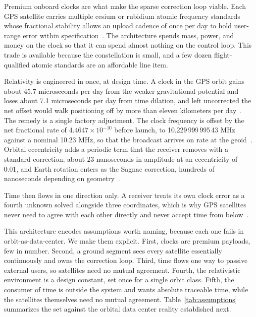 \documentclass[twocolumn,10pt]{article}
\begin{document}
Premium onboard clocks are what make the sparse correction loop viable. Each GPS satellite carries multiple cesium or rubidium atomic frequency standards whose fractional stability allows an upload cadence of once per day to hold user-range error within specification~\cite{gpssps,ashby2003}. The architecture spends mass, power, and money on the clock so that it can spend almost nothing on the control loop. This trade is available because the constellation is small, and a few dozen flight-qualified atomic standards are an affordable line item.

Relativity is engineered in once, at design time. A clock in the GPS orbit gains about 45.7 microseconds per day from the weaker gravitational potential and loses about 7.1 microseconds per day from time dilation, and left uncorrected the net offset would walk positioning off by more than eleven kilometers per day~\cite{pascual2005}. The remedy is a single factory adjustment. The clock frequency is offset by the net fractional rate of $4.4647\times10^{-10}$ before launch, to 10.229\,999\,995\,43 MHz against a nominal 10.23 MHz, so that the broadcast arrives on rate at the geoid~\cite{ashby2003}. Orbital eccentricity adds a periodic term that the receiver removes with a standard correction, about 23 nanoseconds in amplitude at an eccentricity of 0.01, and Earth rotation enters as the Sagnac correction, hundreds of nanoseconds depending on geometry~\cite{ashby2003}.

Time then flows in one direction only. A receiver treats its own clock error as a fourth unknown solved alongside three coordinates, which is why GPS satellites never need to agree with each other directly and never accept time from below~\cite{ashby2003,pascual2005}.

This architecture encodes assumptions worth naming, because each one fails in orbit-as-data-center. We make them explicit. First, clocks are premium payloads, few in number. Second, a ground segment sees every satellite essentially continuously and owns the correction loop. Third, time flows one way to passive external users, so satellites need no mutual agreement. Fourth, the relativistic environment is a design constant, set once for a single orbit class. Fifth, the consumer of time is outside the system and wants absolute traceable time, while the satellites themselves need no mutual agreement. Table~\ref{tab:assumptions} summarizes the set against the orbital data center reality established next.
\end{document}

